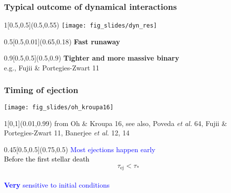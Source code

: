\documentclass[xcolor=dvipsnames,professionalfonts, aspectratio=169]{beamer}
\begin{document}
\begin{frame}
   \frametitle{\textcolor{white!80!Yellow}{Typical outcome of dynamical
       interactions}}
   \begin{textblock}{1}[0.5,0.5](0.5,0.55)
     \centering
     \texttt{[image: fig\_slides/dyn\_res]}
   \end{textblock}

   \begin{textblock}{0.5}[0.5,0.01](0.65,0.18)
     \centering
     \textcolor{white!80!Yellow}{\Large \bf Fast runaway }
   \end{textblock}


   \begin{textblock}{0.9}[0.5,0.5](0.5,0.9)
     \centering
     \textcolor{white!80!Yellow}{\Large \bf \phantom{Fast ejection +}Tighter and more massive binary}\\
     \hfill\textcolor{gray!50}{\tiny e.g., Fujii \& Portegies-Zwart
       11}
   \end{textblock}


\end{frame}
\egroup


\begin{frame}
  \frametitle{Timing of ejection}

  \texttt{[image: fig\_slides/oh\_kroupa16]}

  \begin{textblock}{1}[0,1](0.01,0.99)
    \textcolor{gray!50}{\tiny from Oh \& Kroupa 16, \linebreak see also, Poveda \emph{et
      al.} 64, Fujii \& Portegies-Zwart 11, Banerjee \emph{et al.} 12,
  14}\hfill\,
  \end{textblock}

  \begin{textblock}{0.45}[0.5,0.5](0.75,0.5)
    \centering
    \textcolor{Blue}{Most ejections happen early}\\
    \textcolor{Black}{Before the first stellar death}\\
    $$ \tau_\mathrm{ej} < \tau_*$$\\
    \vspace*{30pt}
    \textcolor{Blue}{{\bf Very} sensitive to initial conditions}
  \end{textblock}
\end{frame}
\end{document}
